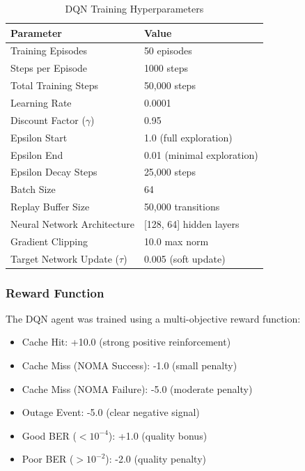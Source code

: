 \documentclass[12pt,a4paper]{article}
\begin{document}
\begin{table}[htbp]
\centering
\caption{DQN Training Hyperparameters}
\label{tab:dqn_params}
\begin{tabular}{|l|l|}
\hline
\textbf{Parameter} & \textbf{Value} \\
\hline
Training Episodes & 50 episodes \\
\hline
Steps per Episode & 1000 steps \\
\hline
Total Training Steps & 50,000 steps \\
\hline
Learning Rate & 0.0001 \\
\hline
Discount Factor ($\gamma$) & 0.95 \\
\hline
Epsilon Start & 1.0 (full exploration) \\
\hline
Epsilon End & 0.01 (minimal exploration) \\
\hline
Epsilon Decay Steps & 25,000 steps \\
\hline
Batch Size & 64 \\
\hline
Replay Buffer Size & 50,000 transitions \\
\hline
Neural Network Architecture & [128, 64] hidden layers \\
\hline
Gradient Clipping & 10.0 max norm \\
\hline
Target Network Update ($\tau$) & 0.005 (soft update) \\
\hline
\end{tabular}
\end{table}

\subsubsection{Reward Function}

The DQN agent was trained using a multi-objective reward function:

\begin{itemize}
    \item Cache Hit: +10.0 (strong positive reinforcement)
    \item Cache Miss (NOMA Success): -1.0 (small penalty)
    \item Cache Miss (NOMA Failure): -5.0 (moderate penalty)
    \item Outage Event: -5.0 (clear negative signal)
    \item Good BER ($< 10^{-4}$): +1.0 (quality bonus)
    \item Poor BER ($> 10^{-2}$): -2.0 (quality penalty)
\end{itemize}
\end{document}
